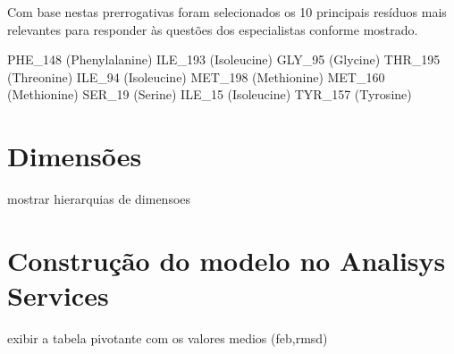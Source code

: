 Com base nestas prerrogativas foram selecionados os 10 principais resíduos mais relevantes para responder às questões dos especialistas conforme mostrado.

\begin{itemize}
	PHE_148 (Phenylalanine)
	ILE_193 (Isoleucine)
	GLY_95 (Glycine)
	THR_195 (Threonine)
	ILE_94 (Isoleucine)
	MET_198 (Methionine)
	MET_160 (Methionine)
	SER_19 (Serine)
	ILE_15 (Isoleucine)
	TYR_157 (Tyrosine)
\end{itemize}

\section{Dimensões}
	mostrar hierarquias de dimensoes
	
\section{Construção do modelo no Analisys Services}
	exibir a tabela pivotante com os valores medios (feb,rmsd)
